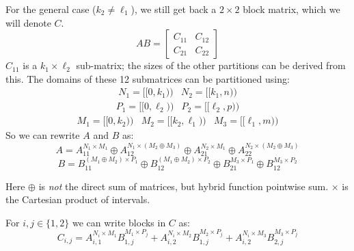 \documentclass{letter}
\begin{document}
For the general case ($k_2 \neq \ell_1$), we still get back a $2 \times 2$ block matrix, which we will denote $C$.
\begin{equation}
	AB = \left[ \begin{array}{cc} C_{11} & C_{12} \\ C_{21} & C_{22} \end{array} \right]
\end{equation}
$C_{11}$ is a $k_1 \times \ell_2$ sub-matrix; the sizes of the other partitions can be derived from this.
The domains of these 12 submatrices can be partitioned using:
\begin{equation*}\begin{array}{cc}
	N_1 = [\![0,k_1)\!) & N_2 = [\![k_1, n)\!) 
\end{array}\end{equation*}
\begin{equation*}\begin{array}{cc}
	P_1 = [\![0, \ell_2)\!) & P_2 = [\![ \ell_2, p)\!)
\end{array}\end{equation*}
\begin{equation*}\begin{array}{ccc}
	M_1 = [\![0,k_2)\!) & M_2 = [\![ k_2, \ell_1)\!) & M_3 = [\![ \ell_1, m)\!)
\end{array}\end{equation*}
So we can rewrite $A$ and $B$ as:
\begin{equation}
	A = 	A_{11}^{N_1 \times M_1} \oplus A_{12}^{N_1 \times (M_2 \oplus M_3)} \oplus 
			A_{21}^{N_2 \times M_1} \oplus A_{22}^{N_2 \times (M_2 \oplus M_3)}
\end{equation}
\begin{equation}
	B = 		B_{11}^{(M_1 \oplus M_2) \times P_1} \oplus B_{12}^{(M_1 \oplus M_2) \times P_2} \oplus 
			B_{21}^{M_3 \times P_1} \oplus B_{12}^{M_3 \times P_2}
\end{equation}

Here $\oplus$ is \emph{not} the direct sum of matrices, but hybrid function pointwise sum. 
$\times$ is the Cartesian product of intervals. 

For $i,j \in \{ 1,2 \}$ we can write blocks in $C$ as:
\begin{equation}
	C_{i,j} 	= A_{i,1}^{N_i \times M_1} B_{1,j}^{M_1 \times P_j} 
			+ A_{i,2}^{N_i \times M_2} B_{1,j}^{M_2 \times P_j}
			+ A_{i,2}^{N_i \times M_3} B_{2,j}^{M_3 \times P_j}
\end{equation}
\end{document}
